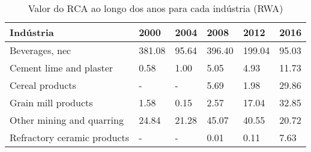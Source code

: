 \begin{table}
\centering
\caption{Valor do RCA ao longo dos anos para cada indústria (RWA)}
\label{tab:ex3-tempo-RWA}
\begin{tabular}{p{6cm}p{1.5cm}p{1.5cm}p{1.5cm}p{1.5cm}p{1.5cm}}
\toprule
                  Indústria &   2000 &  2004 &   2008 &   2012 &  2016 \\
\midrule
             Beverages, nec & 381.08 & 95.64 & 396.40 & 199.04 & 95.03 \\
    Cement lime and plaster &   0.58 &  1.00 &   5.05 &   4.93 & 11.73 \\
            Cereal products &      - &     - &   5.69 &   1.98 & 29.86 \\
        Grain mill products &   1.58 &  0.15 &   2.57 &  17.04 & 32.85 \\
  Other mining and quarring &  24.84 & 21.28 &  45.07 &  40.55 & 20.72 \\
Refractory ceramic products &      - &     - &   0.01 &   0.11 &  7.63 \\
\bottomrule
\end{tabular}
\end{table}
